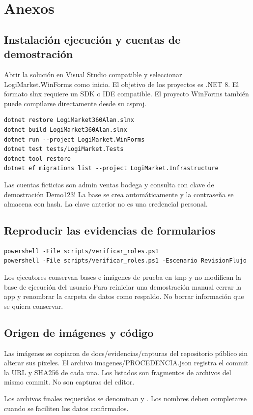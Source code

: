 
\section{Anexos}
\subsection{Instalación ejecución y cuentas de demostración}
Abrir la solución en Visual Studio compatible y seleccionar LogiMarket.WinForms como inicio. El objetivo de los proyectos es .NET 8. El formato slnx requiere un SDK o IDE compatible. El proyecto WinForms también puede compilarse directamente desde su csproj.
\begin{lstlisting}[language={},numbers=none]
dotnet restore LogiMarket360Alan.slnx
dotnet build LogiMarket360Alan.slnx
dotnet run --project LogiMarket.WinForms
dotnet test tests/LogiMarket.Tests
dotnet tool restore
dotnet ef migrations list --project LogiMarket.Infrastructure
\end{lstlisting}
Las cuentas ficticias son admin ventas bodega y consulta con clave de demostración Demo123! La base se crea automáticamente y la contraseña se almacena con hash. La clave anterior no es una credencial personal.

\subsection{Reproducir las evidencias de formularios}
\begin{lstlisting}[language={},numbers=none]
powershell -File scripts/verificar_roles.ps1
powershell -File scripts/verificar_roles.ps1 -Escenario RevisionFlujo
\end{lstlisting}
Los ejecutores conservan bases e imágenes de prueba en tmp y no modifican la base de ejecución del usuario Para reiniciar una demostración manual cerrar la app y renombrar la carpeta de datos como respaldo. No borrar información que se quiera conservar.

\subsection{Origen de imágenes y código}
Las imágenes se copiaron de docs/evidencias/capturas del repositorio público sin alterar sus píxeles. El archivo imagenes/PROCEDENCIA.json registra el commit la URL y SHA256 de cada una. Los listados son fragmentos de archivos del mismo commit. No son capturas del editor.

Los archivos finales requeridos se denominan  y . Los nombres deben completarse cuando se faciliten los datos confirmados.

